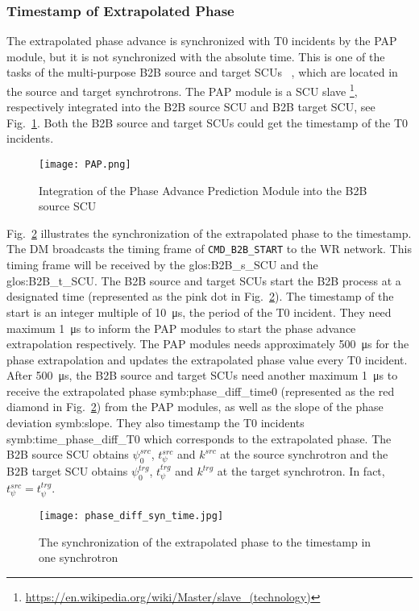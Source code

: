 \subsubsection{Timestamp of Extrapolated Phase}
The extrapolated phase advance is synchronized with T0 incidents by the PAP module, but it is not synchronized with the absolute time. This is one of the tasks of the multi-purpose B2B source and target SCUs ~\cite{beck_new_2012, thieme_scu_2013}, which are located in the source and target synchrotrons. The PAP module is a SCU slave \footnote{\url{https://en.wikipedia.org/wiki/Master/slave_(technology)}}, respectively integrated into the B2B source SCU and B2B target SCU, see Fig.~\ref{PAP}. Both the B2B source and target SCUs could get the timestamp of the T0 incidents. 
 \begin{figure}[!htb]
   \centering   
   \texttt{[image: PAP.png]}
   \caption{Integration of the Phase Advance Prediction Module into the B2B source SCU}
   \label{PAP}
\end{figure}

Fig.~\ref{phase_diff_syn_time} illustrates the synchronization of the extrapolated phase to the timestamp. The DM broadcasts the timing frame of \verb|CMD_B2B_START| to the WR network. This timing frame will be received by the \gls{glos:B2B_s_SCU} and the \gls{glos:B2B_t_SCU}. The B2B source and target SCUs start the B2B process at a designated time (represented as the pink dot in Fig.~\ref{phase_diff_syn_time}). The timestamp of the start is an integer multiple of \SI{10}{\us}, the period of the T0 incident. They need maximum \SI{1}{\us} to inform the PAP modules to start the phase advance extrapolation respectively. The PAP modules needs approximately \SI{500}{\us} for the phase extrapolation and updates the extrapolated phase value every T0 incident. After \SI{500}{\us}, the B2B source and target SCUs need another maximum \SI{1}{\us} to receive the extrapolated phase \gls{symb:phase_diff_time0} (represented as the red diamond in Fig.~\ref{phase_diff_syn_time}) from the PAP modules, as well as the slope of the phase deviation \gls{symb:slope}. They also timestamp the T0 incidents \gls{symb:time_phase_diff_T0} which corresponds to the extrapolated phase. The B2B source SCU obtains $\psi^\mathit{src}_0$, $t_\psi^\mathit{src}$ and $k^\mathit{src}$ at the source synchrotron and the B2B target SCU obtains $\psi^\mathit{trg}_0$, $t_\psi^\mathit{trg}$ and $k^\mathit{trg}$ at the target synchrotron. In fact, $t_\psi^\mathit{src}=t_\psi^\mathit{trg}$.
 \begin{figure}[!htb]
   \centering   
   \texttt{[image: phase\_diff\_syn\_time.jpg]}
   \caption{The synchronization of the extrapolated phase to the timestamp in one synchrotron}
   \label{phase_diff_syn_time}
\end{figure}

